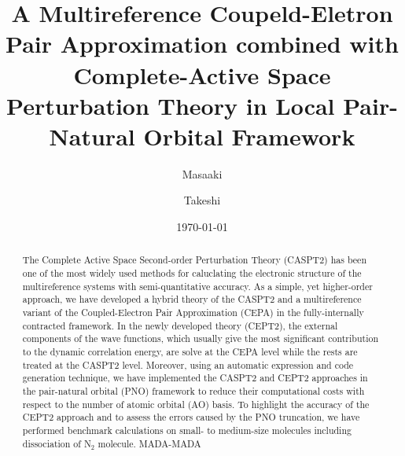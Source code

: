 \documentclass[aip,jcp,amsmath,twocolumn,floatfix,reprint,fleqn]{revtex4-1}
\begin{document}
\title{\color{blue}
  A Multireference Coupeld-Eletron Pair Approximation combined with Complete-Active Space Perturbation Theory in Local Pair-Natural Orbital Framework}
\date{\today}
\author{Masaaki }

\author{Takeshi }

\begin{abstract}  
  The Complete Active Space Second-order Perturbation Theory (CASPT2) has been one of the most widely used methods for caluclating the electronic structure of the multireference systems with semi-quantitative accuracy.
  As a simple, yet higher-order approach, we have developed a hybrid theory of the CASPT2 and a multireference variant of the Coupled-Electron Pair Approximation (CEPA) in the fully-internally contracted framework.
  In the newly developed theory (CEPT2), the external components of the wave functions, which usually give the most significant contribution to the dynamic correlation energy, are solve at the CEPA level while the rests are treated at the CASPT2 level.
  Moreover, using an automatic expression and code generation technique, we have implemented the CASPT2 and CEPT2 approaches in the pair-natural orbital (PNO) framework to reduce their computational costs with respect to the number of atomic orbital (AO) basis.
  To highlight the accuracy of the CEPT2 approach and to assess the errors caused by the PNO truncation, we have performed benchmark calculations on small- to medium-size molecules including dissociation of N${}_2$ molecule.
  MADA-MADA
  
\end{abstract}

\maketitle
\end{document}

